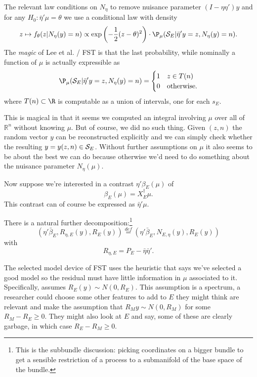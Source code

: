 \documentclass{article}
\newcommand{\OLS}{\bar{\beta}}
\begin{document}
        The relevant law conditions on $N_{\eta}$ to remove nuisance
        parameter $(I-\eta\eta')y$ and for any  $H_0:\bar{\eta}'\mu=\theta$ we use a
        conditional law with density
        \begin{equation}
          \label{eq:selective:density}
        z \mapsto f_{\theta}(z | N_{\eta}(y)=n) \propto \exp \left(-\frac{1}{2}(z-\theta)^2 \right)
        \cdot \P_{\mu}({\cal S}_E | \bar{\eta}'y=z, N_{\eta}(y)=n).
        \end{equation}
        The {\em magic} of Lee et al. / FST is that the last probability, while nominally
        a function of $\mu$ is actually expressible as
        \begin{equation}
          \label{eq:prob:selection}
        \P_{\mu}({\cal S}_E | \bar{\eta}'y=z, N_{\eta}(y)=n) =
        \begin{cases}
          1 & z \in T(n) \\
          0 & \text{otherwise.}
          \end{cases}
        \end{equation}
        where $T(n) \subset \R$ is computable as a union of intervals, one for each $s_E$.

        This is magical in that it seems we computed an integral involving $\mu$ over all
        of $\mathbb{R}^n$ without knowing $\mu$. But of course, we did no such thing.
        Given $(z,n)$ the random vector $y$ can be reconstructed explicitly and we can
        simply check whether the resulting $y=y(z,n) \in {\cal S}_E$.
        Without further assumptions on $\mu$ it also seems to be about the best we can do
        because otherwise we'd need to do something about the nuisance parameter $N_{\eta}(\mu)$.

        Now suppose we're interested in a contrast $\eta'\beta_E(\mu)$ of
        $$\beta_E(\mu)=X_E^{\dagger}\mu.$$
        This contrast can of course be expressed as $\bar{\eta}'\mu$.
        
        There is a natural further decomposition:\footnote{This is the subbundle discussion: picking coordinates on a bigger bundle to get a sensible restriction of a process to a submanifold of the base space of the bundle.}
        $$
        (\eta'\OLS_E, R_{\eta,E}(y), R_E(y)) \overset{def}{=} (\eta'\OLS_E, N_{E,\eta}(y), R_E(y))
        $$
        with
        $$
        R_{\eta,E} = P_E - \bar{\eta}\bar{\eta}'.
        $$

        The selected model device of FST uses the heuristic that says
        we've selected a good model so the 
        residual must have little information in $\mu$ associated to it.  Specifically, assumes
        $R_E(y) \sim N(0, R_E)$. This assumption is a spectrum, a researcher could choose some
        other features to add to $E$ they might think are relevant and make the assumption that
        $R_{M}y \sim N(0, R_M)$ for some $R_{M}-R_E \geq 0$. They might
        also look at $E$ and say, some of these are clearly garbage, in which case $R_E-R_M \geq 0$.
\end{document}
